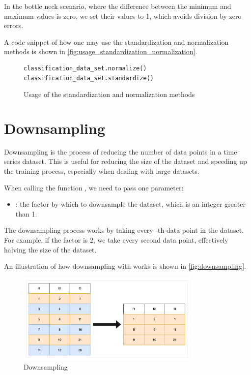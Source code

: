 \documentclass[review]{AIM_report}
\begin{document}
In the bottle neck scenario, where the difference between the minimum and maximum values is zero, we set their values to 1, which avoids division by zero errors.

A code snippet of how one may use the standardization and normalization methods is shown in \autoref{fig:usage_standardization_normalization}.
\begin{figure}[H]
    \begin{lstlisting}[style=python]
classification_data_set.normalize()
classification_data_set.standardize()
    \end{lstlisting}
    \caption{Usage of the standardization and normalization methods}
    \label{fig:usage_standardization_normalization}
\end{figure}

\newpage
\section{Downsampling}
\label{sec:downsampling}
Downsampling is the process of reducing the number of data points in a time series dataset. This is useful for reducing the size of the dataset and speeding up the training process, especially when dealing with large datasets.

When calling the function \downsample, we need to pass one parameter:
\begin{itemize}
    \item \factor: the factor by which to downsample the dataset, which is an integer greater than 1.
\end{itemize}

The downsampling process works by taking every \factor-th data point in the dataset. For example, if the factor is 2, we take every second data point, effectively halving the size of the dataset.

An illustration of how downsampling with  works is shown in \autoref{fig:downsampling}.
\begin{figure}
    \centering
    \includegraphics[width=0.8\textwidth]{files/downsampling/downsampling.png}
    \caption{Downsampling}
    \label{fig:downsampling}
\end{figure}
\end{document}
